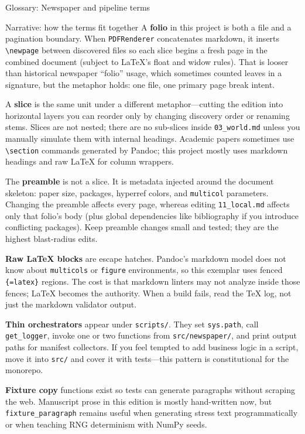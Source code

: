 \documentclass[
  ignorenonframetext,
]{beamer}
\begin{document}
\begin{frame}[fragile]{Glossary: Newspaper and pipeline terms}
\begin{block}{Narrative: how the terms fit together}
\protect{}\label{narrative-how-the-terms-fit-together}
A \textbf{folio} in this project is both a file and a pagination
boundary. When \texttt{PDFRenderer} concatenates markdown, it inserts
\texttt{\textbackslash{}newpage} between discovered files so each slice
begins a fresh page in the combined document (subject to LaTeX's float
and widow rules). That is looser than historical newspaper ``folio''
usage, which sometimes counted leaves in a signature, but the metaphor
holds: one file, one primary page break intent.

A \textbf{slice} is the same unit under a different metaphor---cutting
the edition into horizontal layers you can reorder only by changing
discovery order or renaming stems. Slices are not nested; there are no
sub-slices inside \texttt{03\_world.md} unless you manually simulate
them with internal headings. Academic papers sometimes use
\texttt{\textbackslash{}section} commands generated by Pandoc; this
project mostly uses markdown headings and raw LaTeX for column wrappers.

The \textbf{preamble} is not a slice. It is metadata injected around the
document skeleton: paper size, packages, hyperref colors, and
\texttt{multicol} parameters. Changing the preamble affects every page,
whereas editing \texttt{11\_local.md} affects only that folio's body
(plus global dependencies like bibliography if you introduce conflicting
packages). Keep preamble changes small and tested; they are the highest
blast-radius edits.

\textbf{Raw LaTeX blocks} are escape hatches. Pandoc's markdown model
does not know about \texttt{multicols} or \texttt{figure} environments,
so this exemplar uses fenced \texttt{\{=latex\}} regions. The cost is
that markdown linters may not analyze inside those fences; LaTeX becomes
the authority. When a build fails, read the TeX log, not just the
markdown validator output.

\textbf{Thin orchestrators} appear under \texttt{scripts/}. They set
\texttt{sys.path}, call \texttt{get\_logger}, invoke one or two
functions from \texttt{src/newspaper/}, and print output paths for
manifest collectors. If you feel tempted to add business logic in a
script, move it into \texttt{src/} and cover it with tests---this
pattern is constitutional for the monorepo.

\textbf{Fixture copy} functions exist so tests can generate paragraphs
without scraping the web. Manuscript prose in this edition is mostly
hand-written now, but \texttt{fixture\_paragraph} remains useful when
generating stress text programmatically or when teaching RNG determinism
with NumPy seeds.


\end{block}
\end{frame}
\end{document}
